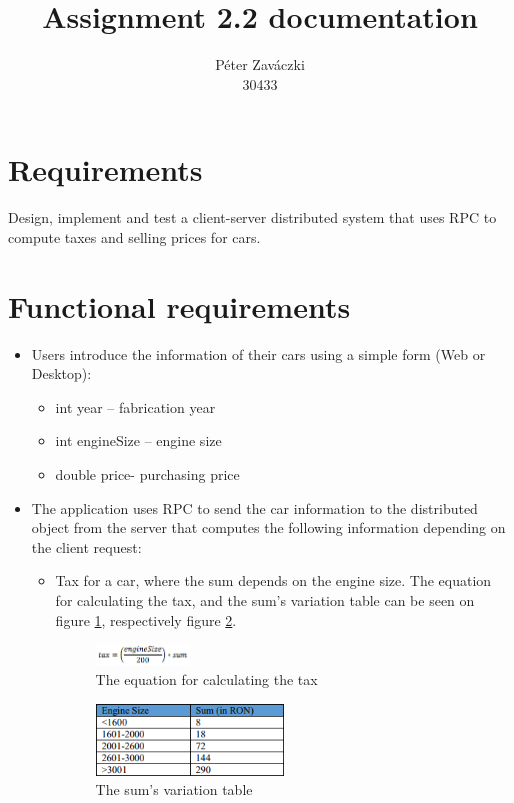 \documentclass[a4paper,10pt]{report}
\title{Assignment 2.2 documentation}
\author{Péter Zaváczki\\30433}
\begin{document}
\maketitle

\section{Requirements}
Design, implement and test a client-server distributed system that uses RPC to compute taxes
and selling prices for cars. 

\section{Functional requirements}
\begin{itemize}
    \item Users introduce the information of their cars using a simple form (Web or Desktop):
    \begin{itemize}
        \item int year – fabrication year
        \item int engineSize – engine size
        \item double price- purchasing price
    \end{itemize}
    \item The application uses RPC to send the car information to the distributed object from the server that computes the following information depending on the client request:    
    \begin{itemize}
        \item Tax for a car, where the sum depends on the engine size. The equation for calculating the tax, and the sum's variation table can be seen on figure \ref{fig:tax_equation}, respectively figure \ref{fig:tax_sum_variation}.
        
        \begin{figure}[h]
            \centering
            \includegraphics[width=0.25\textwidth]{tax_equation.png}
            \caption{The equation for calculating the tax}
            \label{fig:tax_equation}
        \end{figure}
        
        \begin{figure}[h]
            \centering
            \includegraphics[width=0.5\textwidth]{tax_sum_variation.png}
            \caption{The sum's variation table}
            \label{fig:tax_sum_variation}
        \end{figure}


\end{itemize}
\end{itemize}
\end{document}
